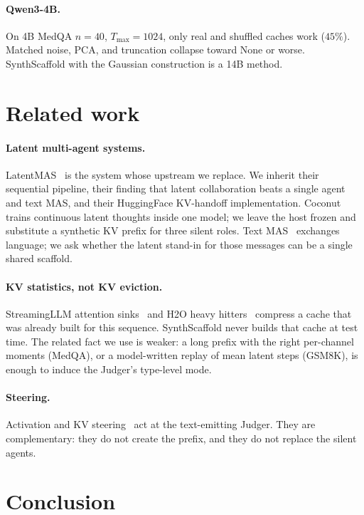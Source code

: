 \documentclass[11pt]{article}
\begin{document}
\paragraph{Qwen3-4B.}
On 4B MedQA $n{=}40$, $T_{\max}{=}1024$, only real and shuffled caches
work ($45\%$).
Matched noise, PCA, and truncation collapse toward None or worse.
SynthScaffold with the Gaussian construction is a 14B method.

\section{Related work}
\label{sec:related}

\paragraph{Latent multi-agent systems.}
LatentMAS~\citep{zou2025latentmas} is the system whose upstream we
replace.
We inherit their sequential pipeline, their finding that latent
collaboration beats a single agent and text MAS, and their
HuggingFace KV-handoff implementation.
Coconut~\citep{hao2024coconut} trains continuous latent thoughts inside
one model; we leave the host frozen and substitute a synthetic KV
prefix for three silent roles.
Text MAS~\citep{du2023society,wu2023autogen} exchanges language; we ask
whether the latent stand-in for those messages can be a single shared
scaffold.

\paragraph{KV statistics, not KV eviction.}
StreamingLLM attention sinks~\citep{xiao2024streamingllm} and H2O
heavy hitters~\citep{zhang2023h2o} compress a cache that was already
built for this sequence.
SynthScaffold never builds that cache at test time.
The related fact we use is weaker: a long prefix with the right
per-channel moments (MedQA), or a model-written replay of mean latent
steps (GSM8K), is enough to induce the Judger's type-level mode.

\paragraph{Steering.}
Activation and KV steering~\citep{turner2023actadd,rimsky2024caa,chen2025seal,li2025kvsteer}
act at the text-emitting Judger.
They are complementary: they do not create the prefix, and they do not
replace the silent agents.

\section{Conclusion}
\label{sec:conclusion}
\end{document}
